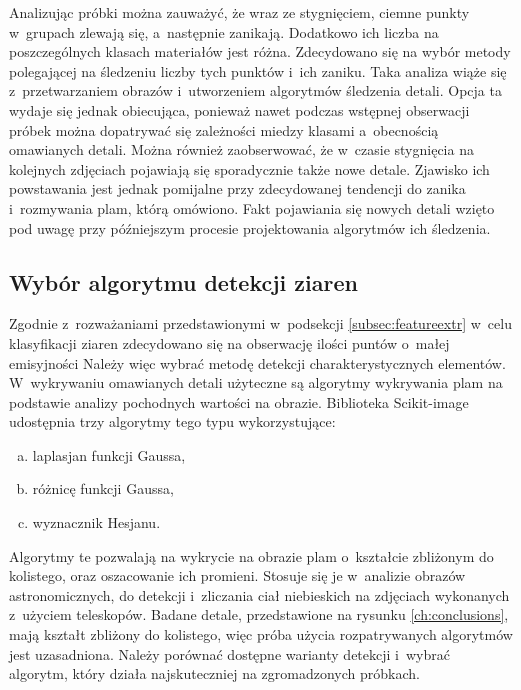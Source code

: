 Analizując próbki można zauważyć, że wraz ze stygnięciem, ciemne punkty
w~grupach zlewają się, a~następnie zanikają.
Dodatkowo ich liczba na poszczególnych klasach materiałów jest różna.
Zdecydowano się na wybór metody polegającej na śledzeniu liczby tych punktów
i~ich zaniku.
Taka analiza wiąże się z~przetwarzaniem obrazów i~utworzeniem algorytmów
śledzenia detali.
Opcja ta wydaje się jednak obiecująca, ponieważ nawet podczas wstępnej
obserwacji próbek można dopatrywać się zależności miedzy klasami a~obecnością
omawianych detali.
Można również zaobserwować, że w~czasie stygnięcia na kolejnych zdjęciach
pojawiają się sporadycznie także nowe detale.
Zjawisko ich powstawania jest jednak pomijalne przy zdecydowanej tendencji
do zanika i~rozmywania plam, którą omówiono.
Fakt pojawiania się nowych detali wzięto pod uwagę przy późniejszym procesie
projektowania algorytmów ich śledzenia.

\subsection{Wybór algorytmu detekcji ziaren}
\label{subsec:blobdetect}
Zgodnie z~rozważaniami przedstawionymi w~podsekcji \ref{subsec:featureextr}
w~celu klasyfikacji ziaren zdecydowano się na obserwację ilości puntów
o~małej emisyjności
Należy więc wybrać metodę detekcji charakterystycznych elementów.
W~wykrywaniu omawianych detali użyteczne są algorytmy wykrywania plam na
podstawie analizy pochodnych wartości na obrazie.
Biblioteka Scikit-image udostępnia trzy algorytmy tego typu wykorzystujące:
\begin{enumerate}[a)]
	\item laplasjan funkcji Gaussa,
	\item różnicę funkcji Gaussa,
	\item wyznacznik Hesjanu.
\end{enumerate}
Algorytmy te pozwalają na wykrycie na obrazie plam o~kształcie zbliżonym
do kolistego, oraz oszacowanie ich promieni.
Stosuje się je w~analizie obrazów astronomicznych, do detekcji
i~zliczania ciał niebieskich na zdjęciach wykonanych z~użyciem teleskopów.
Badane detale, przedstawione na rysunku \ref{ch:conclusions},
mają kształt zbliżony do kolistego, więc próba użycia rozpatrywanych
algorytmów jest uzasadniona.
Należy porównać dostępne warianty detekcji i~wybrać algorytm, który
działa najskuteczniej na zgromadzonych próbkach.


